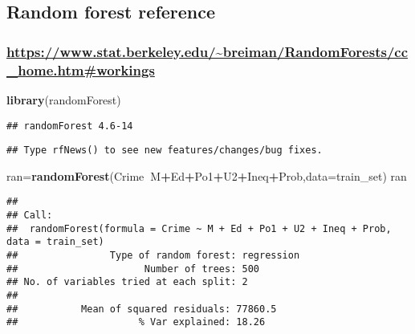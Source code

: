 \documentclass[]{article}
\newenvironment{Shaded}{\begin{snugshade}}{\end{snugshade}}
\newcommand{\DataTypeTok}[1]{\textcolor[rgb]{0.13,0.29,0.53}{#1}}
\newcommand{\KeywordTok}[1]{\textcolor[rgb]{0.13,0.29,0.53}{\textbf{#1}}}
\newcommand{\NormalTok}[1]{#1}
\newcommand{\OperatorTok}[1]{\textcolor[rgb]{0.81,0.36,0.00}{\textbf{#1}}}
\begin{document}
\hypertarget{random-forest-reference}{%
\subsection{Random forest reference}\label{random-forest-reference}}

\hypertarget{httpswww.stat.berkeley.edubreimanrandomforestscc_home.htmworkings}{%
\subsubsection{\texorpdfstring{\url{https://www.stat.berkeley.edu/~breiman/RandomForests/cc_home.htm\#workings}}{https://www.stat.berkeley.edu/\textasciitilde breiman/RandomForests/cc\_home.htm\#workings}}\label{httpswww.stat.berkeley.edubreimanrandomforestscc_home.htmworkings}}

\begin{Shaded}
\begin{Highlighting}[]
\KeywordTok{library}\NormalTok{(randomForest)}
\end{Highlighting}
\end{Shaded}

\begin{verbatim}
## randomForest 4.6-14
\end{verbatim}

\begin{verbatim}
## Type rfNews() to see new features/changes/bug fixes.
\end{verbatim}

\begin{Shaded}
\begin{Highlighting}[]
\NormalTok{ran=}\KeywordTok{randomForest}\NormalTok{(Crime}\OperatorTok{~}\NormalTok{M}\OperatorTok{+}\NormalTok{Ed}\OperatorTok{+}\NormalTok{Po1}\OperatorTok{+}\NormalTok{U2}\OperatorTok{+}\NormalTok{Ineq}\OperatorTok{+}\NormalTok{Prob,}\DataTypeTok{data=}\NormalTok{train_set)}
\NormalTok{ran}
\end{Highlighting}
\end{Shaded}

\begin{verbatim}
## 
## Call:
##  randomForest(formula = Crime ~ M + Ed + Po1 + U2 + Ineq + Prob,      data = train_set) 
##                Type of random forest: regression
##                      Number of trees: 500
## No. of variables tried at each split: 2
## 
##           Mean of squared residuals: 77860.5
##                     % Var explained: 18.26
\end{verbatim}
\end{document}

